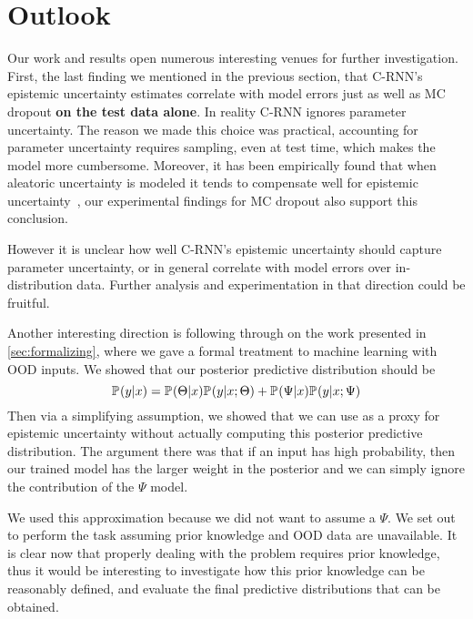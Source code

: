 \documentclass[../main.tex]{subfiles}
\begin{document}
\section{Outlook}

Our work and results open numerous interesting venues for further investigation. First, the last finding we mentioned in the previous section, that C-RNN's epistemic uncertainty estimates correlate with model errors just as well as MC dropout \textbf{on the test data alone}. In reality C-RNN ignores parameter uncertainty. The reason we made this choice was practical, accounting for parameter uncertainty requires sampling, even at test time, which makes the model more cumbersome. Moreover, it has been empirically found that when aleatoric uncertainty is modeled it tends to compensate well for epistemic uncertainty~\citep{kendall2017uncertainties}, our experimental findings for MC dropout also support this conclusion. 

However it is unclear how well C-RNN's epistemic uncertainty should capture parameter uncertainty, or in general correlate with model errors over in-distribution data. Further analysis and experimentation in that direction could be fruitful. 

Another interesting direction is following through on the work presented in \cref{sec:formalizing}, where we gave a formal treatment to machine learning with OOD inputs. We showed that our posterior predictive distribution should be 
$$
    \mathbb{P}_{}(y|x) = \mathbb{P}_{}(\Theta|x) \mathbb{P}_{}(y| x; \Theta) + \mathbb{P}_{}(\Psi|x) \mathbb{P}_{}(y | x; \Psi)
$$
Then via a simplifying assumption, we showed that we can use  as a proxy for epistemic uncertainty without actually computing this posterior predictive distribution. The argument there was that if an input has high probability, then our trained model has the larger weight in the posterior and we can simply ignore the contribution of the $\Psi$ model. 

We used this approximation because we did not want to assume a $\Psi$. We set out to perform the task assuming prior knowledge and OOD data are unavailable.
It is clear now that properly dealing with the problem requires prior knowledge, thus it would be interesting to investigate how this prior knowledge can be reasonably defined, and evaluate the final predictive distributions that can be obtained. 

\end{document}
